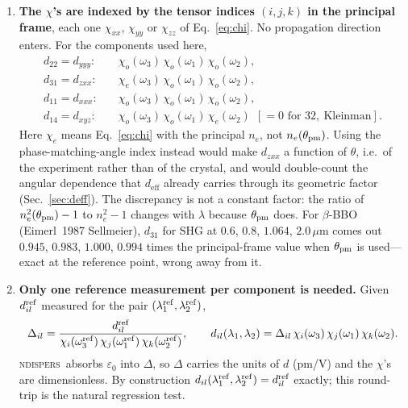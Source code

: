 \documentclass[aps,pra,preprint,amsmath,amssymb,nofootinbib,superscriptaddress]{revtex4-2}
\newcommand{\ueff}{d_{\mathrm{eff}}}
\newcommand{\ndispers}{\textsc{ndispers}}
\begin{document}
\begin{enumerate}
\item \textbf{The $\chi$'s are indexed by the tensor indices $(i,j,k)$
in the principal frame}, each one $\chi_{xx}$, $\chi_{yy}$ or
$\chi_{zz}$ of Eq.~\eqref{eq:chi}. No propagation direction enters.
For the components used here,
\begin{equation}
\begin{aligned}
  d_{22}=d_{yyy}:&\quad \chi_o(\omega_3)\,\chi_o(\omega_1)\,\chi_o(\omega_2),\\
  d_{31}=d_{zxx}:&\quad \chi_e(\omega_3)\,\chi_o(\omega_1)\,\chi_o(\omega_2),\\
  d_{11}=d_{xxx}:&\quad \chi_o(\omega_3)\,\chi_o(\omega_1)\,\chi_o(\omega_2),\\
  d_{14}=d_{xyz}:&\quad \chi_o(\omega_3)\,\chi_o(\omega_1)\,\chi_e(\omega_2)\ \ [=0 \text{ for } 32,\ \text{Kleinman}].
\end{aligned}
\label{eq:chi_assign}
\end{equation}
Here $\chi_e$ means Eq.~\eqref{eq:chi} with the principal $n_e$, not
$n_e(\theta_{\rm pm})$. Using the phase-matching-angle index instead would
make $d_{zxx}$ a function of $\theta$, i.e.\ of the experiment rather than
of the crystal, and would double-count the angular dependence that
$\ueff$ already carries through its geometric factor (Sec.~\ref{sec:deff}).
The discrepancy is not a constant factor: the ratio of $n_e^2(\theta_{\rm pm})-1$
to $n_e^2-1$ changes with $\lambda$ because $\theta_{\rm pm}$ does. For
$\beta$-BBO (Eimerl~1987 Sellmeier), $d_{31}$ for SHG at $0.6$, $0.8$,
$1.064$, $2.0\,\mu$m comes out $0.945$, $0.983$, $1.000$, $0.994$ times the
principal-frame value when $\theta_{\rm pm}$ is used---exact at the
reference point, wrong away from it.

\item \textbf{Only one reference measurement per component is needed.}
Given $d_{il}^{\rm ref}$ measured for the pair $(\lambda_1^{\rm ref},\lambda_2^{\rm ref})$,
\begin{equation}
  \Delta_{il} = \frac{d_{il}^{\rm ref}}
  {\chi_i(\omega_3^{\rm ref})\,\chi_j(\omega_1^{\rm ref})\,\chi_k(\omega_2^{\rm ref})},
  \qquad
  d_{il}(\lambda_1,\lambda_2) = \Delta_{il}\,
  \chi_i(\omega_3)\,\chi_j(\omega_1)\,\chi_k(\omega_2).
  \label{eq:delta}
\end{equation}
\ndispers\ absorbs $\varepsilon_0$ into $\Delta$, so $\Delta$ carries the
units of $d$ (pm/V) and the $\chi$'s are dimensionless. By construction
$d_{il}(\lambda_1^{\rm ref},\lambda_2^{\rm ref}) = d_{il}^{\rm ref}$ exactly; this
round-trip is the natural regression test.
\end{enumerate}
\end{document}
